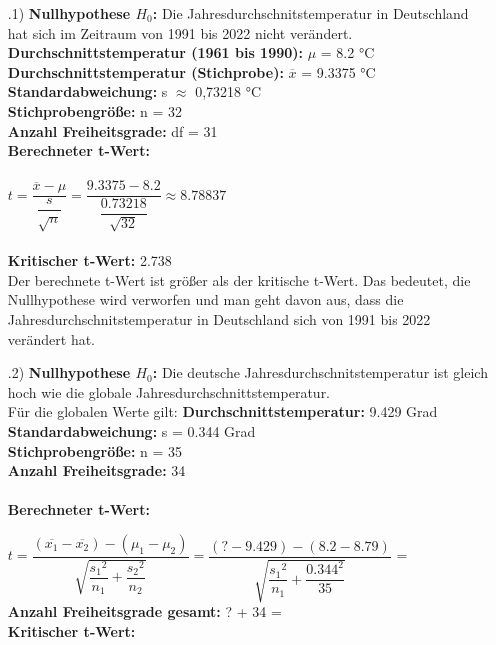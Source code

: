 \documentclass[12pt]{scrartcl}
\begin{document}
\exercise{}
\begin{itemize}
    \item[\theenumi.1)] \textbf{Nullhypothese $H_0$:} Die Jahresdurchschnitstemperatur in Deutschland hat sich 
                                                      im Zeitraum von 1991 bis 2022 nicht verändert.\\
                        \textbf{Durchschnittstemperatur (1961 bis 1990):} $\mu$ = 8.2 °C\\
                        \textbf{Durchschnittstemperatur (Stichprobe):} $\overline{x}$ = 9.3375 °C\\
                        \textbf{Standardabweichung:} s $\approx$ 0,73218 °C\\
                        \textbf{Stichprobengröße:} n = 32\\
                        \textbf{Anzahl Freiheitsgrade:} df = 31\\
                        \textbf{Berechneter t-Wert:} \\\\
                        $t = \dfrac{\overline{x}-\mu}{\dfrac{s}{\sqrt{n}}} = \dfrac{9.3375-8.2}{\dfrac{0.73218}{\sqrt{32}}} \approx 8.78837$\\\\
                        \textbf{Kritischer t-Wert:} 2.738\\
                        Der berechnete t-Wert ist größer als der kritische t-Wert. Das bedeutet, die Nullhypothese wird verworfen und man geht davon aus,
                        dass die Jahresdurchschnitstemperatur in Deutschland sich von 1991 bis 2022 verändert hat.
                        
	\item[\theenumi.2)] \textbf{Nullhypothese $H_0$:} Die deutsche Jahresdurchschnitstemperatur ist gleich hoch wie die globale Jahresdurchschnittstemperatur.\\
	Für die globalen Werte gilt:
						\textbf{Durchschnittstemperatur:} 9.429 Grad\\
                        \textbf{Standardabweichung:} s = 0.344 Grad \\
                        \textbf{Stichprobengröße:} n = 35\\
                        \textbf{Anzahl Freiheitsgrade:} 34 \\
                        \\
\textbf{Berechneter t-Wert:} 

$t=\dfrac{(\overline{x_{1}}-\overline{x_{2}}) - (\mu_{1}-\mu_{2})}{\sqrt{\dfrac{{s_{1}}^{2}}{n_1}+\dfrac{{s_{2}}^{2}}{n_2}}} 
=\dfrac{(? - 9.429)- (8.2-8.79)}{\sqrt{\dfrac{{s_{1}}^{2}}{n_1}+\dfrac{{0.344}^{2}}{35}}} $ =\\

\textbf{Anzahl Freiheitsgrade gesamt:} ? + 34 = \\
\textbf{Kritischer t-Wert:} \\
\end{itemize}
                        
                        
\end{document}
